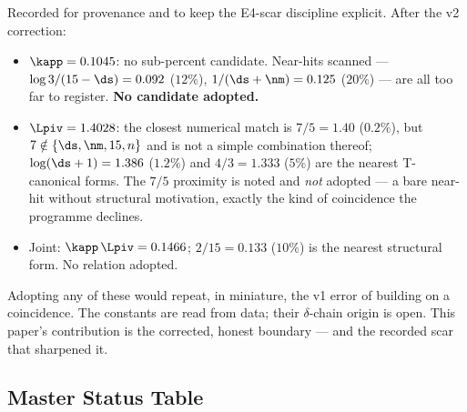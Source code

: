 \documentclass[12pt, a4paper]{article}
\begin{document}
\begin{openqbox}[title={OBS-ZC99-01: The Candidate Audit After Correction}]
Recorded for provenance and to keep the E4-scar discipline explicit. After the
v2 correction:
\begin{itemize}[leftmargin=1.6em, noitemsep]
  \item $\kapp=0.1045$: no sub-percent candidate. Near-hits scanned ---
    $\log 3/(15-\ds)=0.092$ ($12\%$), $1/(\ds+\nm)=0.125$ ($20\%$) ---
    are all too far to register. \textbf{No candidate adopted.}
  \item $\Lpiv=1.4028$: the closest numerical match is $7/5=1.40$ ($0.2\%$), but
    $7\notin\{\ds,\nm,15,n\}$ and is not a simple combination thereof; $\log(\ds+1)
    =1.386$ ($1.2\%$) and $4/3=1.333$ ($5\%$) are the nearest T-canonical forms.
    The $7/5$ proximity is noted and \emph{not} adopted --- a bare near-hit
    without structural motivation, exactly the kind of coincidence the programme
    declines.
  \item Joint: $\kapp\,\Lpiv=0.1466$; $2/15=0.133$ ($10\%$) is the nearest
    structural form. No relation adopted.
\end{itemize}
Adopting any of these would repeat, in miniature, the v1 error of building on a
coincidence. The constants are read from data; their $\delta$-chain origin is
open. This paper's contribution is the corrected, honest boundary --- and the
recorded scar that sharpened it.
\end{openqbox}

\subsection{Master Status Table}
\end{document}
